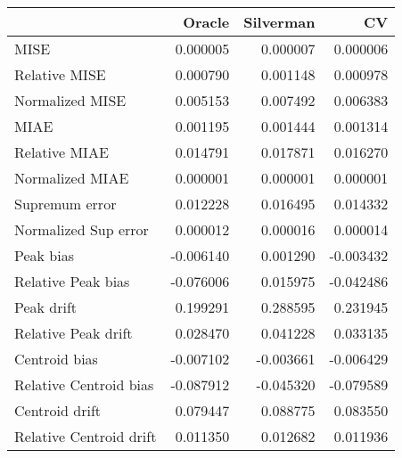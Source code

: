 \begin{tabular}{lrrr}
  \toprule
 & Oracle & Silverman & CV \\ 
  \midrule
MISE & 0.000005 & 0.000007 & 0.000006 \\ 
  Relative MISE & 0.000790 & 0.001148 & 0.000978 \\ 
  Normalized MISE & 0.005153 & 0.007492 & 0.006383 \\ 
  MIAE & 0.001195 & 0.001444 & 0.001314 \\ 
  Relative MIAE & 0.014791 & 0.017871 & 0.016270 \\ 
  Normalized MIAE & 0.000001 & 0.000001 & 0.000001 \\ 
  Supremum error & 0.012228 & 0.016495 & 0.014332 \\ 
  Normalized Sup error & 0.000012 & 0.000016 & 0.000014 \\ 
  Peak bias & -0.006140 & 0.001290 & -0.003432 \\ 
  Relative Peak bias & -0.076006 & 0.015975 & -0.042486 \\ 
  Peak drift & 0.199291 & 0.288595 & 0.231945 \\ 
  Relative Peak drift & 0.028470 & 0.041228 & 0.033135 \\ 
  Centroid bias & -0.007102 & -0.003661 & -0.006429 \\ 
  Relative Centroid bias & -0.087912 & -0.045320 & -0.079589 \\ 
  Centroid drift & 0.079447 & 0.088775 & 0.083550 \\ 
  Relative Centroid drift & 0.011350 & 0.012682 & 0.011936 \\ 
   \bottomrule
\end{tabular}
